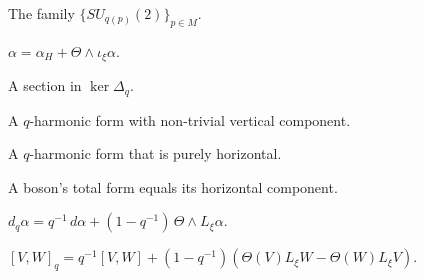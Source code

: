 \begin{definition}
  \label{def:quantum-gauge-group-lean}
  The family $\{SU_{q(p)}(2)\}_{p \in M}$.
\end{definition}

\begin{definition}
  \label{def:reeb-decomposition}
  $\alpha = \alpha_H + \varTheta \wedge \iota_\xi \alpha$.
\end{definition}

\begin{definition}
  \label{def:q-harmonic-form}
  A section in $\ker \Delta_q$.
\end{definition}

\begin{definition}[Fermion]
  \label{def:fermion}
  A $q$-harmonic form with non-trivial vertical component.
\end{definition}

\begin{definition}[Boson]
  \label{def:boson}
  A $q$-harmonic form that is purely horizontal.
\end{definition}

\begin{theorem}
  \label{thm:boson-total-eq-horizontal}
  \leanok
  A boson's total form equals its horizontal component.
\end{theorem}

\begin{definition}
  \label{def:q-ext-deriv}
  $d_q \alpha = q^{-1}\,d\alpha + (1-q^{-1})\,\varTheta \wedge L_\xi \alpha$.
\end{definition}

\begin{definition}
  \label{def:q-lie-bracket}
  $[V,W]_q = q^{-1}[V,W] + (1-q^{-1})(\varTheta(V)L_\xi W - \varTheta(W)L_\xi V)$.
\end{definition}

